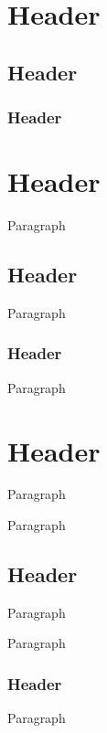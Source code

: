 \section{Header}
\subsection{Header}
\subsubsection{Header}
\hrulefill\section{Header}
Paragraph

\subsection{Header}
Paragraph

\subsubsection{Header}
Paragraph

\hrulefillParagraph

\section{Header}
Paragraph

Paragraph

\subsection{Header}
Paragraph

Paragraph

\subsubsection{Header}
Paragraph
